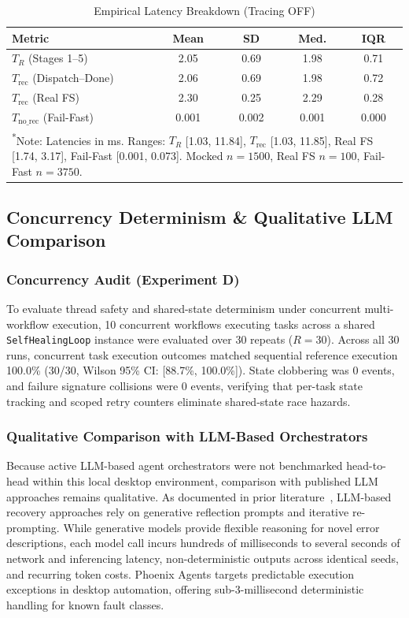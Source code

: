 \documentclass[conference]{IEEEtran}
\begin{document}
\begin{table}[t]
\centering
\caption{Empirical Latency Breakdown (Tracing OFF)}
\label{tab:latency_breakdown}
\footnotesize
\begin{tabularx}{\columnwidth}{Xcccc}
\toprule
\textbf{Metric} & \textbf{Mean} & \textbf{SD} & \textbf{Med.} & \textbf{IQR} \\
\midrule
$T_R$ (Stages 1--5) & 2.05 & 0.69 & 1.98 & 0.71 \\
$T_{\text{rec}}$ (Dispatch--Done) & 2.06 & 0.69 & 1.98 & 0.72 \\
$T_{\text{rec}}$ (Real FS) & 2.30 & 0.25 & 2.29 & 0.28 \\
$T_{\text{no\_rec}}$ (Fail-Fast) & 0.001 & 0.002 & 0.001 & 0.000 \\
\bottomrule
\multicolumn{5}{p{0.95\columnwidth}}{\textsuperscript{*}Note: Latencies in ms. Ranges: $T_R$ [1.03, 11.84], $T_{\text{rec}}$ [1.03, 11.85], Real FS [1.74, 3.17], Fail-Fast [0.001, 0.073]. Mocked $n=1500$, Real FS $n=100$, Fail-Fast $n=3750$.}
\end{tabularx}
\end{table}

\subsection{Concurrency Determinism \& Qualitative LLM Comparison}
\subsubsection{Concurrency Audit (Experiment D)}
To evaluate thread safety and shared-state determinism under concurrent multi-workflow execution, 10 concurrent workflows executing tasks across a shared \texttt{SelfHealingLoop} instance were evaluated over 30 repeats ($R=30$). Across all 30 runs, concurrent task execution outcomes matched sequential reference execution 100.0\% (30/30, Wilson 95\% CI: [88.7\%, 100.0\%]). State clobbering was 0 events, and failure signature collisions were 0 events, verifying that per-task state tracking and scoped retry counters eliminate shared-state race hazards.

\subsubsection{Qualitative Comparison with LLM-Based Orchestrators}
Because active LLM-based agent orchestrators were not benchmarked head-to-head within this local desktop environment, comparison with published LLM approaches remains qualitative. As documented in prior literature~\cite{babu2026,wu2025}, LLM-based recovery approaches rely on generative reflection prompts and iterative re-prompting. While generative models provide flexible reasoning for novel error descriptions, each model call incurs hundreds of milliseconds to several seconds of network and inferencing latency, non-deterministic outputs across identical seeds, and recurring token costs. Phoenix Agents targets predictable execution exceptions in desktop automation, offering sub-3-millisecond deterministic handling for known fault classes.
\end{document}
